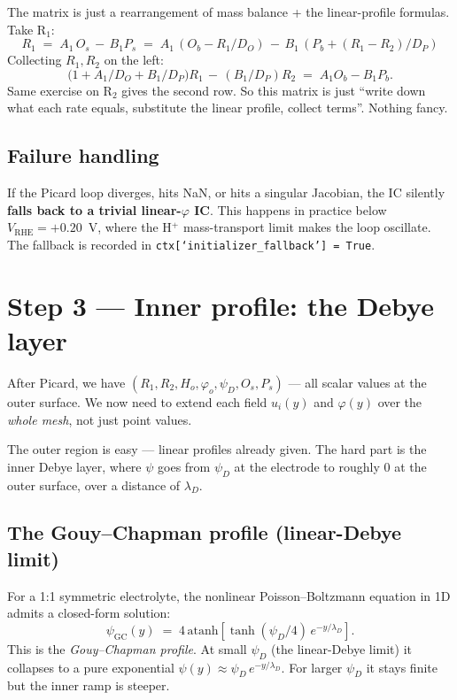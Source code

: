 \documentclass[11pt]{article}
\newcommand{\VRHE}{V_{\mathrm{RHE}}}
\newcommand{\lD}{\lambda_D}
\begin{document}
The matrix is just a rearrangement of mass balance + the linear-profile
formulas. Take R$_1$:
\[
  R_1 \;=\; A_1\,O_s \,-\, B_1 P_s
       \;=\; A_1\,(O_b - R_1/D_O) \,-\, B_1\,(P_b + (R_1-R_2)/D_P)
\]
Collecting $R_1, R_2$ on the left:
\[
  \bigl(1 + A_1/D_O + B_1/D_P\bigr) R_1 \,-\, (B_1/D_P) R_2
   \;=\; A_1 O_b - B_1 P_b.
\]
Same exercise on R$_2$ gives the second row. So this matrix is just
``write down what each rate equals, substitute the linear profile,
collect terms''. Nothing fancy.

\subsection{Failure handling}

If the Picard loop diverges, hits NaN, or hits a singular Jacobian,
the IC silently \textbf{falls back to a trivial linear-$\varphi$ IC}.
This happens in practice below $\VRHE = +0.20$~V, where the H$^+$
mass-transport limit makes the loop oscillate. The fallback is
recorded in
\texttt{ctx[`initializer\_fallback'] = True}.

\section{Step 3 --- Inner profile: the Debye layer}

After Picard, we have $(R_1, R_2, H_o, \varphi_o, \psi_D, O_s, P_s)$
--- all scalar values at the outer surface. We now need to extend
each field $u_i(y)$ and $\varphi(y)$ over the \emph{whole mesh}, not
just point values.

The outer region is easy --- linear profiles already given. The hard
part is the inner Debye layer, where $\psi$ goes from
$\psi_D$ at the electrode to roughly $0$ at the outer surface, over a
distance of $\lD$.

\subsection{The Gouy--Chapman profile (linear-Debye limit)}

For a 1:1 symmetric electrolyte, the nonlinear Poisson--Boltzmann
equation in 1D admits a closed-form solution:
\begin{equation}
  \psi_{\mathrm{GC}}(y)
   \;=\; 4\,\mathrm{atanh}\!\left[\tanh(\psi_D / 4)\,
                                  e^{-y/\lD}\right].
\end{equation}
This is the \emph{Gouy--Chapman profile}. At small $\psi_D$ (the
linear-Debye limit) it collapses to a pure exponential
$\psi(y) \approx \psi_D\,e^{-y/\lD}$. For larger $\psi_D$ it stays
finite but the inner ramp is steeper.
\end{document}
